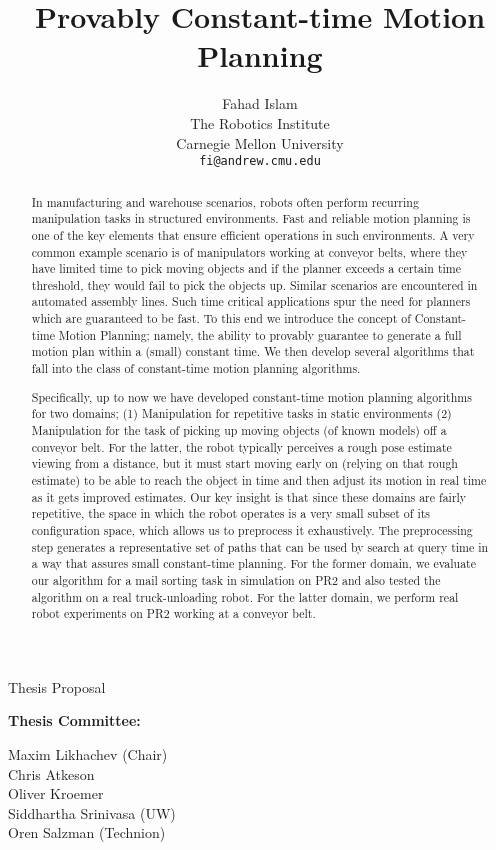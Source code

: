 \documentclass[a4paper,10pt]{article}
\title{Provably Constant-time Motion Planning}
\author{Fahad Islam\\
The Robotics Institute\\
Carnegie Mellon University\\
\texttt{fi@andrew.cmu.edu}}
\begin{document}
\maketitle

\centering
\Large{Thesis Proposal}
\vspace{40mm}

\large{
\textbf{Thesis Committee:}

Maxim Likhachev (Chair)\\
Chris Atkeson\\
Oliver Kroemer\\
Siddhartha Srinivasa (UW)\\
Oren Salzman (Technion)\\
}
\newpage

\begin{abstract}
In manufacturing and warehouse scenarios, robots often perform recurring manipulation tasks in structured environments. Fast and reliable motion planning is one of the key elements that ensure efficient operations in such environments. A very common example scenario is of manipulators working at conveyor belts, where they have limited time to pick moving objects and if the planner exceeds a certain time threshold, they would fail to pick the objects up. Similar scenarios are encountered in automated assembly lines. Such time critical applications spur the need for planners which are guaranteed to be fast. To this end we introduce the concept of Constant-time Motion Planning; namely, the ability to provably guarantee to generate a full motion plan within a (small) constant time. We then develop several algorithms that fall into the class of constant-time motion planning algorithms.

Specifically, up to now we have developed constant-time motion planning algorithms for two domains; (1) Manipulation for repetitive tasks in static environments (2) Manipulation for the task of picking up moving objects (of known models) off a conveyor belt. For the latter, the robot typically perceives a rough pose estimate viewing from a distance, but it must start moving early on (relying on that rough estimate) to be able to reach the object in time and then adjust its motion in real time as it gets improved estimates.
Our key insight is that since these domains are fairly repetitive, the space in which the robot operates is a very small subset of its configuration space, which allows us to preprocess it exhaustively. The preprocessing step generates a representative set of paths that can be used by search at query time in a way that assures small constant-time planning.
%
For the former domain, we evaluate our algorithm for a mail sorting task in simulation on PR2 and also tested the algorithm on a real truck-unloading robot. For the latter domain, we perform real robot experiments on PR2 working at a conveyor belt.


\end{abstract}
\end{document}
